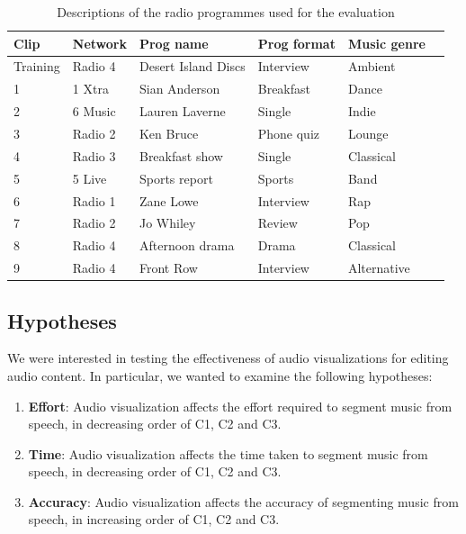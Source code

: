 \begin{table}[htbp]
  \begin{center}
    {\small
    \begin{tabular}{l l l l l l}
      \hline
      \textbf{Clip} & \textbf{Network} & \textbf{Prog name} & \textbf{Prog format} & \textbf{Music genre} \\ \hline
      Training & Radio 4 & Desert Island Discs & Interview & Ambient \\
      1 & 1 Xtra & Sian Anderson & Breakfast & Dance \\
      2 & 6 Music & Lauren Laverne & Single & Indie \\
      3 & Radio 2 & Ken Bruce & Phone quiz & Lounge \\
      4 & Radio 3 & Breakfast show & Single & Classical \\
      5 & 5 Live & Sports report & Sports & Band \\
      6 & Radio 1 & Zane Lowe & Interview & Rap \\
      7 & Radio 2 & Jo Whiley & Review & Pop \\
      8 & Radio 4 & Afternoon drama & Drama & Classical \\
      9 & Radio 4 & Front Row & Interview & Alternative \\ \hline
    \end{tabular}
  }
  \end{center}
  \caption{Descriptions of the radio programmes used for the evaluation}
  \label{tab:clips}
\end{table}

\subsection{Hypotheses}

We were interested in testing the effectiveness of audio visualizations for editing audio content. In particular, we
wanted to examine the following hypotheses:

\newcommand{\subscript}[2]{$#1 _ #2$}
\begin{enumerate}[label=H\arabic*.]
  \item \textbf{Effort}: Audio visualization affects the effort required to segment music from speech, in
    decreasing order of C1, C2 and C3.
  \item \textbf{Time}: Audio visualization affects the time taken to segment music from speech, in decreasing
    order of C1, C2 and C3.
  \item \textbf{Accuracy}: Audio visualization affects the accuracy of segmenting music from speech, in
    increasing order of C1, C2 and C3.
\end{enumerate}

